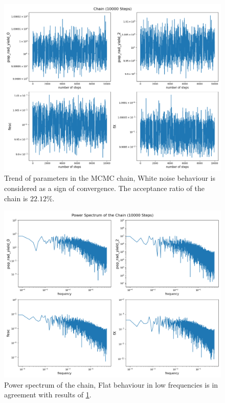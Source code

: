 \documentclass[12pt, TexShade, letterpaper]{report}
\begin{document}
\begin{figure}[h!]
\centering
\includegraphics[scale =0.5]{chain_known_curve.png}
\caption[Trend of parameters]{Trend of parameters in the MCMC chain, White noise behaviour is considered as a sign of convergence. The acceptance ratio of the chain is $22.12\%.$}
\label{fig:chain_known_curve}
\end{figure}

\begin{figure}[h!]
\centering
\includegraphics[scale =0.5]{power_spectrum_known_curve.png}
\caption[Power spectrum of the chain]{Power spectrum of the chain, Flat behaviour in low frequencies is in agreement with results of \ref{fig:chain_known_curve}.}
\label{fig:power_spectrum_known_curve}
\end{figure}
\end{document}
